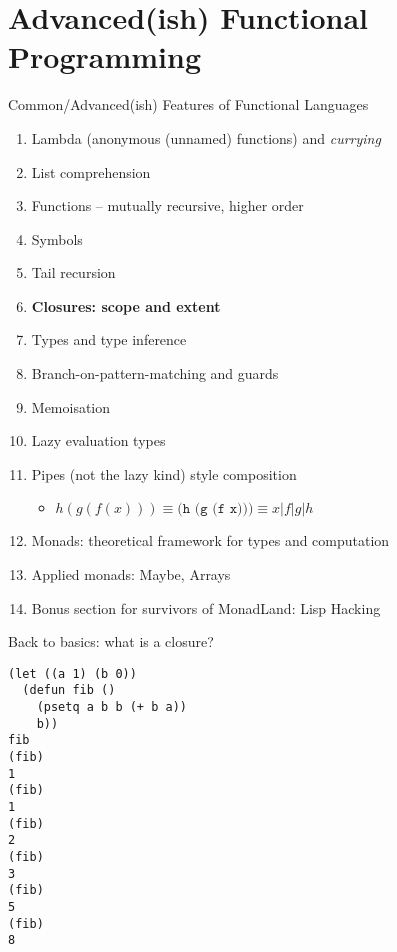 \documentclass[presentation]{beamer}
\begin{document}
\section{Advanced(ish) Functional Programming}
\begin{frame}{Common/Advanced(ish) Features of Functional Languages}
\label{sec:org95ddb74}

\begin{enumerate}
\item Lambda (anonymous (unnamed) functions) and \emph{currying}
\item List comprehension
\item Functions -- mutually recursive, higher order
\item Symbols
\item Tail recursion
\item \textbf{Closures: scope and extent}
\item Types and type inference
\item Branch-on-pattern-matching and guards
\item Memoisation
\item Lazy evaluation types
\item Pipes (not the lazy kind) style composition
\begin{itemize}
\item  \(h(g(f(x)))\equiv\texttt{(h (g (f x)))}\equiv{}x\vert{f}\vert{g}\vert{h}\)
\end{itemize}
\item Monads: theoretical framework for types and computation
\item Applied monads: Maybe, Arrays
\item Bonus section for survivors of MonadLand: Lisp Hacking
\end{enumerate}

\end{frame}

\begin{frame}[fragile]{Back to basics: what is a closure?}
\begin{verbatim}
(let ((a 1) (b 0))
  (defun fib ()
    (psetq a b b (+ b a))
    b))
fib
(fib)
1
(fib)
1
(fib)
2
(fib)
3
(fib)
5
(fib)
8
\end{verbatim}
\end{frame}
\end{document}
